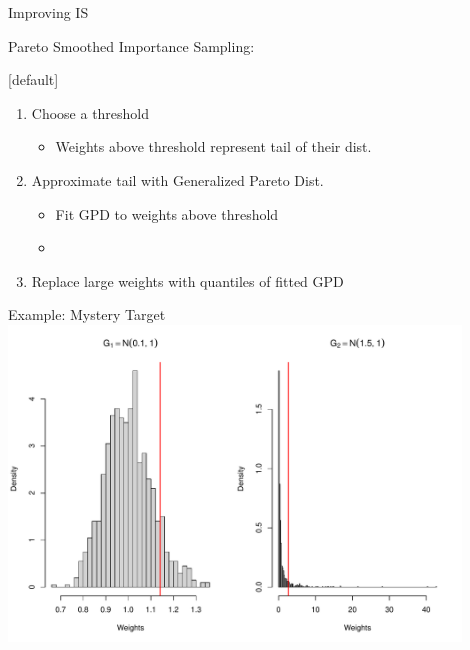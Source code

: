 \documentclass[14pt]{beamer}
\begin{document}
\begin{frame}{Improving IS}
    \begin{outline}
    \1 Pareto Smoothed Importance Sampling:
        \2 \citep{Veh22} \newline
    \end{outline}

    [default]
    \begin{enumerate}
    \item Choose a threshold
        \begin{itemize}
            \item Weights above threshold represent tail of their dist.
        \end{itemize}
    \item Approximate tail with Generalized Pareto Dist.
    \begin{itemize}
        \item Fit GPD to weights above threshold
        \item \citep{Zha09}
    \end{itemize}
    \item Replace large weights with quantiles of fitted GPD
    \end{enumerate}
\end{frame}

\begin{frame}{Example: Mystery Target}
    \centering
    \includegraphics[height=0.9\textheight, width=0.9\textwidth, keepaspectratio]{Figures/Wt Hist - Pareto Thresh.pdf}
\end{frame}
\end{document}
